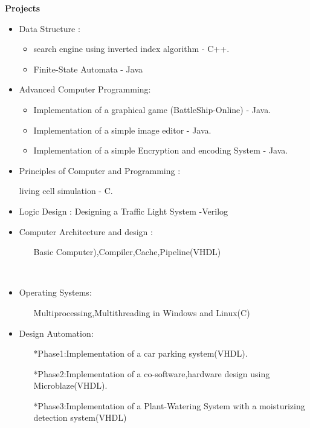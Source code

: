\documentclass[a4paper,12pt,final]{memoir}
\newcommand{\Sep}{\vspace{1.5em}}
\newcommand{\SmallSep}{\vspace{0.5em}}
\newcommand{\CVSection}[1]
	{\Large\textbf{#1}\par
	\SmallSep\normalsize\normalfont}
\begin{document}
\Sep 

\CVSection{Projects}
\begin{itemize}

	\item Data Structure :
		\begin{itemize}[$\circ$]
		\item	search engine using inverted index algorithm - C++.
	     \item   Finite-State Automata - Java
		\end{itemize}
		
	\item Advanced Computer Programming:
		\begin{itemize}[$\circ$]
		\item  Implementation of a graphical game (BattleShip-Online) - Java.
     	\item Implementation of a simple image editor - Java.
	    \item Implementation of a simple Encryption and encoding System  - Java.
		\end{itemize}
		
	\item Principles of Computer and Programming : 
	
	living cell simulation - C.
   	\item Logic Design : 
   	Designing a Traffic Light System -Verilog
   	\item Computer Architecture and design :
   		\begin{itemize}[$\circ$]
		\item[] Basic Computer),Compiler,Cache,Pipeline(VHDL)
		
\end{itemize}




\newpage
\normalsize\normalfont
\framebreak
\framebreak

\\

\item Operating Systems:
\begin{itemize}[$\circ$]
\item[Multiprocessing,Multithreading in Windows and Linux(C)]
		\end{itemize}
		
	\item Design Automation:
		\begin{itemize}[$\circ$]
		\item [*Phase1:Implementation of a car parking system(VHDL).]
     	\item [*Phase2:Implementation of a co-software,hardware design using]
     	      Microblaze(VHDL).
	    \item[*Phase3:Implementation of a Plant-Watering System with a moisturizing]
	          detection system(VHDL)
	          

\end{itemize}
\end{itemize}
\end{document}
